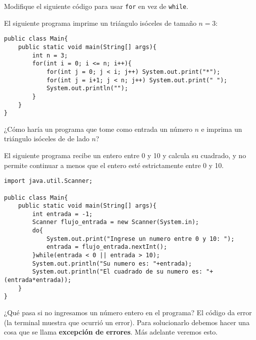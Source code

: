 \documentclass[12pt]{article}
\newcounter{it}
\theoremstyle{largebreak}
\begin{document}
    \begin{excer}
        Modifique el siguiente código para usar \lstinline|for| en vez de \lstinline|while|.
    \end{excer}

    \begin{exa}
        El siguiente programa imprime un triángulo isóceles de tamaño $n=3$:
        \begin{lstlisting}[caption={Programa que imprime un triángulo de tamaño $n=3$.},label=DescriptiveLabel]
public class Main{
    public static void main(String[] args){
        int n = 3;
        for(int i = 0; i <= n; i++){
            for(int j = 0; j < i; j++) System.out.print("*");
            for(int j = i+1; j < n; j++) System.out.print(" ");
            System.out.println("");
        }
    }
}
        \end{lstlisting}
    \end{exa}

    \begin{excer}
        ¿Cómo haría un programa que tome como entrada un número $n$ e imprima un triángulo isóceles de de lado $n$?
    \end{excer}

    \begin{exa}
        El siguiente programa recibe un entero entre 0 y 10 y calcula su cuadrado, y no permite continuar a menos que el entero esté estrictamente entre 0 y 10.
        \begin{lstlisting}[caption={Programa que recibe entero entre 0 y 10.},label=DescriptiveLabel]
import java.util.Scanner;

public class Main{
    public static void main(String[] args){
        int entrada = -1;
        Scanner flujo_entrada = new Scanner(System.in);
        do{
            System.out.print("Ingrese un numero entre 0 y 10: ");
            entrada = flujo_entrada.nextInt();
        }while(entrada < 0 || entrada > 10);
        System.out.println("Su numero es: "+entrada);
        System.out.println("El cuadrado de su numero es: "+(entrada*entrada));
    }
}
        \end{lstlisting}
        ¿Qué pasa si no ingresamos un número entero en el programa? El código da error (la terminal muestra que ocurrió un error). Para solucionarlo debemos hacer una cosa que se llama \textbf{excepción de errores}. Más adelante veremos esto.
    \end{exa}
\end{document}
